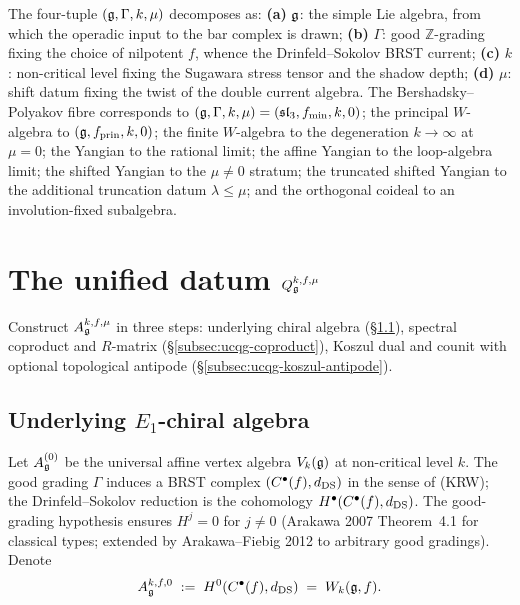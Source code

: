 \begin{remark}
\label{rem:four-params}
The four-tuple $(\mathfrak{g}, \Gamma, k, \mu)$ decomposes as:
\textbf{(a)} $\mathfrak{g}$: the simple Lie algebra, from which the operadic
input to the bar complex is drawn;
\textbf{(b)} $\Gamma$: good $\mathbb{Z}$-grading fixing the choice
of nilpotent $f$, whence the Drinfeld--Sokolov BRST current;
\textbf{(c)} $k$: non-critical level fixing the Sugawara stress
tensor and the shadow depth;
\textbf{(d)} $\mu$: shift datum fixing the twist of the double
current algebra.
The Bershadsky--Polyakov fibre corresponds to
$(\mathfrak{g}, \Gamma, k, \mu) = (\mathfrak{sl}_3, f_{\mathrm{min}}, k, 0)$; the
principal $W$-algebra to
$(\mathfrak{g}, f_{\mathrm{prin}}, k, 0)$; the finite $W$-algebra
to the degeneration $k\to\infty$ at $\mu = 0$; the Yangian to the
rational limit; the affine Yangian to the loop-algebra limit;
the shifted Yangian to the $\mu\neq 0$ stratum; the truncated
shifted Yangian to the additional truncation datum $\lambda \le \mu$;
and the orthogonal coideal to an involution-fixed subalgebra.
\end{remark}

\section{The unified datum $Q_{\mathfrak{g}}^{k,f,\mu}$}
\label{sec:ucqg-object}

Construct $A_{\mathfrak{g}}^{k,f,\mu}$ in three steps: underlying chiral
algebra (\S\ref{subsec:ucqg-underlying}), spectral coproduct and
$R$-matrix (\S\ref{subsec:ucqg-coproduct}), Koszul dual and counit
with optional topological antipode (\S\ref{subsec:ucqg-koszul-antipode}).

\subsection{Underlying $E_1$-chiral algebra}
\label{subsec:ucqg-underlying}

Let $A^{(0)}_{\mathfrak{g}}$ be the universal affine vertex algebra
$V_k(\mathfrak{g})$ at non-critical level $k$. The good grading
$\Gamma$ induces a BRST complex $(C^{\bullet}(f), d_{\mathrm{DS}})$ in the sense
of \cite{KacRoanWakimoto03} (KRW); the Drinfeld--Sokolov reduction is
the cohomology $H^{\bullet}(C^{\bullet}(f), d_{\mathrm{DS}})$. The good-grading
hypothesis ensures $H^j = 0$ for $j\neq 0$ (Arakawa 2007 Theorem~4.1
for classical types; extended by Arakawa--Fiebig 2012 to arbitrary
good gradings). Denote
\[
 A_{\mathfrak{g}}^{k,f,0} \;:=\; H^{0}(C^{\bullet}(f), d_{\mathrm{DS}})
 \;=\; W_k(\mathfrak{g}, f).
\]

